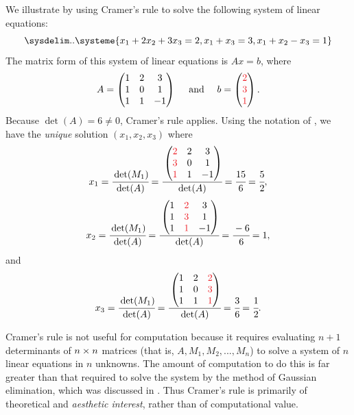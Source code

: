 \begin{example} \label{example 4.3.1}
We illustrate  by using Cramer's rule to solve the following system of linear equations:
\[
    \sysdelim..\systeme{
        x_1 + 2x_2 + 3x_3 = 2,
        x_1 +         x_3 = 3,
        x_1 +  x_2 -  x_3 = 1
    }
\]
The matrix form of this system of linear equations is \(Ax = b\), where
\[
    A = \begin{pmatrix} 1 & 2 & 3 \\ 1 & 0 & 1 \\ 1 & 1 & -1 \end{pmatrix} \quad \text{ and } \quad b = \begin{pmatrix} \RED{2} \\ \RED{3} \\ \RED{1} \end{pmatrix}.
\]
Because \(\det(A) = 6 \ne 0\), Cramer's rule applies.
Using the notation of , we have the \emph{unique} solution \((x_1, x_2, x_3)\) where
\[
    x_1 = \cfrac{\det(M_1)}{\det(A)} = \cfrac{\begin{pmatrix} \RED{2} & 2 & 3 \\ \RED{3} & 0 & 1 \\ \RED{1} & 1 & -1 \end{pmatrix}}{\det(A)} = \cfrac{15}{6} = \cfrac{5}{2},
\]
\[
    x_2 = \cfrac{\det(M_1)}{\det(A)} = \cfrac{\begin{pmatrix} 1 & \RED{2} & 3 \\ 1 & \RED{3} & 1 \\ 1 & \RED{1} & -1 \end{pmatrix}}{\det(A)} = \cfrac{-6}{6} = 1,
\]
and
\[
    x_3 = \cfrac{\det(M_1)}{\det(A)} = \cfrac{\begin{pmatrix} 1 & 2 & \RED{2} \\ 1 & 0 & \RED{3} \\ 1 & 1 & \RED{1} \end{pmatrix}}{\det(A)} = \cfrac{3}{6} = \cfrac{1}{2}.
\]
\end{example}

\begin{remark} \label{remark 4.3.3}
Cramer's rule is not useful for computation because it requires evaluating \(n + 1\) determinants of \(n \times n\) matrices (that is, \(A, M_1, M_2, ..., M_n\)) to solve a system of \(n\) linear equations in \(n\) unknowns.
The amount of computation to do this is far greater than that required to solve the system by the method of Gaussian elimination, which was discussed in .
Thus Cramer's rule is primarily of theoretical and \emph{aesthetic interest}, rather than of computational value.
\end{remark}

